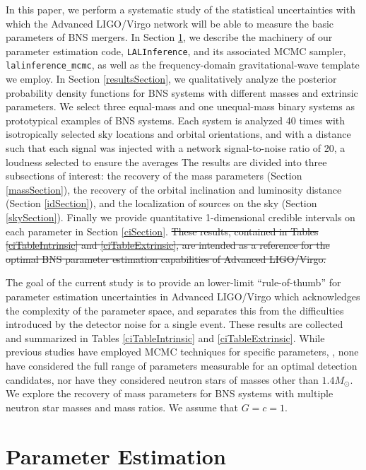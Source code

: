 \documentclass[11pt,a4paper]{emulateapj} 
\newcommand{\carl}[1]{{\color{red} #1}}
\begin{document}
In this paper, we perform a systematic study of the statistical
uncertainties with which the Advanced LIGO/Virgo network will be able
to measure the basic parameters of BNS mergers.  In Section
\ref{PEsection}, we describe the machinery of our parameter estimation
code, \texttt{LALInference}, and its associated MCMC sampler,
\texttt{lalinference\_mcmc}, as well as the frequency-domain
gravitational-wave template we employ.  In Section
\ref{resultsSection}, we qualitatively analyze the posterior
probability density functions for BNS systems with different masses
and extrinsic parameters.  We select three equal-mass and one unequal-mass
 binary systems as prototypical examples of BNS systems.  Each system is analyzed 40 
 times with isotropically selected sky locations and orbital orientations, and with a distance
 such that each signal was injected with a network signal-to-noise ratio of 20, \carl{a loudness selected to
 ensure the averages }
  The results are divided into three subsections of interest: the recovery of the mass
parameters (Section \ref{massSection}), the recovery of the orbital
inclination and luminosity distance (Section \ref{idSection}), and the
localization of sources on the sky (Section \ref{skySection}).
Finally we provide quantitative 1-dimensional credible intervals on
each parameter in Section \ref{ciSection}.  \sout{These results, contained
in Tables \ref{ciTableIntrinsic} and \ref{ciTableExtrinsic}, are
intended as a reference for the optimal BNS parameter estimation
capabilities of Advanced LIGO/Virgo.}


\carl{The goal of the current study is to provide an lower-limit ``rule-of-thumb'' for parameter estimation uncertainties 
in Advanced LIGO/Virgo which acknowledges the complexity of the parameter space, and separates this from
 the difficulties introduced by the detector noise for a single event.  These results are collected and summarized in 
 Tables \ref{ciTableIntrinsic} and \ref{ciTableExtrinsic}.  While previous studies have employed 
 MCMC techniques for specific parameters,  \citep{Nissanke2011,Nissanke2013,Veitch2012}, none have considered 
the full range of parameters measurable for an optimal detection candidates, nor have they considered neutron stars
 of masses other than $1.4M_{\odot}$.  We explore
 the recovery of mass parameters for BNS systems with multiple neutron star masses and mass ratios.  
 We assume that $G=c=1$.}  

\section{Parameter Estimation}
\label{PEsection}
\end{document}
